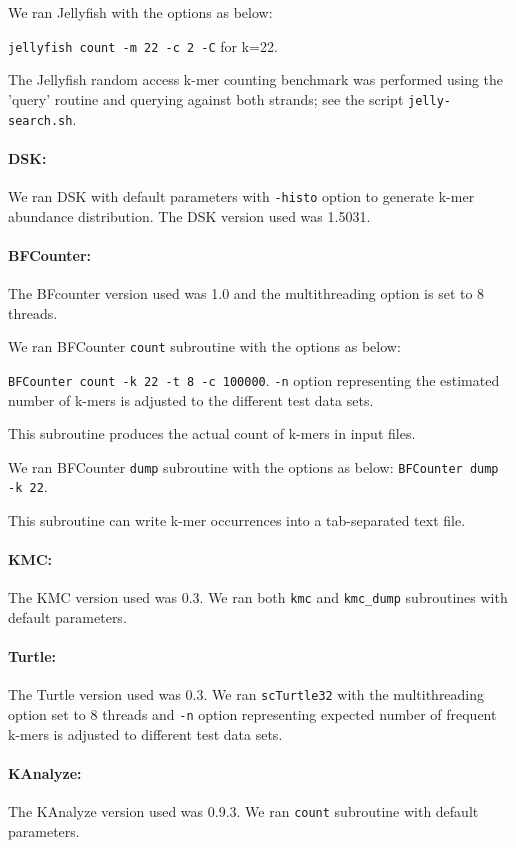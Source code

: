 \documentclass[10pt]{article}
\begin{document}
We ran Jellyfish with the options as below:

{\tt jellyfish count -m 22 -c 2 -C} for k=22.


The Jellyfish random access k-mer counting benchmark was performed
using the 'query' routine and querying against both strands; see
the script {\tt jelly-search.sh}.

\paragraph{DSK:} We ran DSK with default parameters with {\tt -histo} option to generate
k-mer abundance distribution. The DSK version used was 1.5031.

\paragraph{BFCounter:} The BFcounter version used was 1.0 and the multithreading option is set to 8
 threads.
 
We ran BFCounter {\tt count} subroutine with the options as below:
 
 {\tt BFCounter count -k 22 -t 8 -c 100000}.
 {\tt -n} option representing the estimated number of k-mers is adjusted to the different 
 test data sets.
 
 This subroutine produces the actual count of k-mers in input files.
 
We ran BFCounter {\tt dump} subroutine with the options as below:
 {\tt BFCounter dump -k 22}.
 
This subroutine can write k-mer occurrences into a tab-separated text file.

\paragraph{KMC:} The KMC version used was 0.3. We ran both {\tt kmc} and {\tt kmc\_dump} subroutines 
with default parameters.


\paragraph{Turtle:} The Turtle version used was 0.3. We ran {\tt scTurtle32} with the multithreading 
option set to 8 threads and {\tt -n} option representing expected number of frequent k-mers
is adjusted to different test data sets.

\paragraph{KAnalyze:} The KAnalyze version used was 0.9.3. We ran {\tt count} subroutine 
with default parameters.
\end{document}
